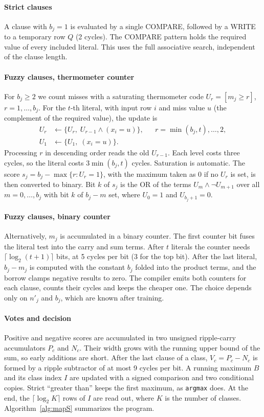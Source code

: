 \documentclass[preprint,review,12pt]{elsarticle}
\begin{document}
\paragraph{Strict clauses}
A clause with $b_j=1$ is evaluated by a single COMPARE, followed by a WRITE to a temporary row $Q$ (2 cycles). The COMPARE pattern holds the required value of every included literal.
This uses the full associative search, independent of the clause length.

\paragraph{Fuzzy clauses, thermometer counter}
For $b_j\ge2$ we count misses with a saturating thermometer code $U_r=[m_j\ge r]$, $r=1,\dots,b_j$.
For the $t$-th literal, with input row $i$ and miss value $u$ (the complement of the required value), the update is
\begin{align}
U_r &\leftarrow \{U_r,\; U_{r-1}\wedge(x_i{=}u)\}, && r=\min(b_j,t),\dots,2,\\
U_1 &\leftarrow \{U_1,\; (x_i{=}u)\}.
\end{align}
Processing $r$ in descending order reads the old $U_{r-1}$.
Each level costs three cycles, so the literal costs $3\min(b_j,t)$ cycles.
Saturation is automatic. The score $s_j=b_j-\max\{r:U_r=1\}$, with the maximum taken as 0 if no $U_r$ is set, is then converted to binary. Bit $k$ of $s_j$ is the OR of the terms $U_m\wedge\lnot U_{m+1}$ over all $m=0,\dots,b_j$ with bit $k$ of $b_j-m$ set, where $U_0=1$ and $U_{b_j+1}=0$.

\paragraph{Fuzzy clauses, binary counter}
Alternatively, $m_j$ is accumulated in a binary counter.
The first counter bit fuses the literal test into the carry and sum terms.
After $t$ literals the counter needs $\lceil\log_2(t+1)\rceil$ bits, at 5 cycles per bit (3 for the top bit).
After the last literal, $b_j-m_j$ is computed with the constant $b_j$ folded into the product terms, and the borrow clamps negative results to zero.
The compiler emits both counters for each clause, counts their cycles and keeps the cheaper one.
The choice depends only on $n'_j$ and $b_j$, which are known after training.

\paragraph{Votes and decision}
Positive and negative scores are accumulated in two unsigned ripple-carry accumulators $P_c$ and $N_c$.
Their width grows with the running upper bound of the sum, so early additions are short.
After the last clause of a class, $V_c=P_c-N_c$ is formed by a ripple subtractor of at most 9 cycles per bit.
A running maximum $B$ and its class index $I$ are updated with a signed comparison and two conditional copies.
Strict ``greater than'' keeps the first maximum, as \texttt{argmax} does.
At the end, the $\lceil\log_2 K\rceil$ rows of $I$ are read out, where $K$ is the number of classes.
Algorithm~\ref{alg:mapS} summarizes the program.
\end{document}
